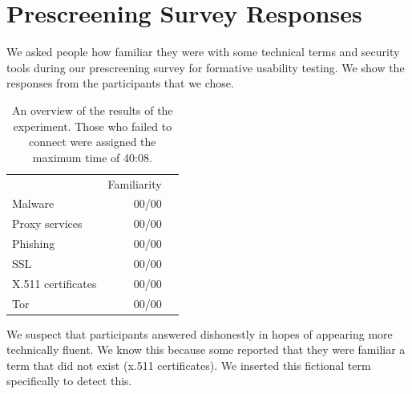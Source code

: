 \documentclass[USenglish,oneside,twocolumn]{article}
\begin{document}
{\color {red}
\section{Prescreening Survey Responses}
\label{prescreening-responses}
We asked people how familiar they were with some technical terms and security tools during our prescreening survey for formative usability testing. We show the responses from the participants that we chose. 

\begin{table}[h]
\centering
\begin{tabular}{l r r}
& Familiarity\\
\noalign{\hrule}
Malware & 00/00\\
Proxy services & 00/00\\
Phishing & 00/00\\
SSL & 00/00\\
X.511 certificates & 00/00\\
Tor & 00/00\\
\end{tabular}
\caption{
An overview of the results of the experiment. Those who
failed to connect were assigned the maximum time of 40:08.
}
\label{table:selfreported-tech}
\end{table}

We suspect that participants answered dishonestly in hopes of appearing more technically fluent. We know this because some reported that they were familiar a term that did not exist (x.511 certificates). We inserted this fictional term specifically to detect this. 

}
\end{document}
